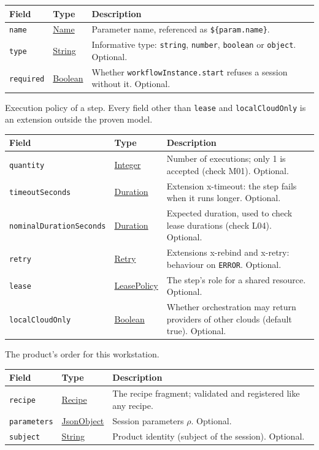 \documentclass[a4paper]{arrowhead}
\newcommand{\mref}[1]{{\textcolor{ArrowheadPurple}{\hyperref[sec:model:#1]{#1}}}}
\newcommand{\pref}[1]{{\textcolor{ArrowheadGrey}{\hyperref[sec:model:primitives:#1]{#1}}}}
\begin{document}
{\small
\begin{longtable}{|p{3.9cm}|p{4.4cm}|p{7.5cm}|}

\hline
\rowcolor{gray!33} Field & Type & Description \\ \hline
\endhead
\texttt{name} & \pref{Name} & Parameter name, referenced as \texttt{\$\{param.name\}}. \\ \hline
\texttt{type} & \pref{String} & Informative type: \texttt{string}, \texttt{number}, \texttt{boolean} or \texttt{object}. Optional. \\ \hline
\texttt{required} & \pref{Boolean} & Whether \texttt{workflow\allowbreak{}Instance.\allowbreak{}start} refuses a session without it. Optional. \\ \hline
\end{longtable}
}

Execution policy of a step. Every field other than \texttt{lease} and \texttt{local\allowbreak{}Cloud\allowbreak{}Only} is an extension outside the proven model.

{\small
\begin{longtable}{|p{3.9cm}|p{4.4cm}|p{7.5cm}|}

\hline
\rowcolor{gray!33} Field & Type & Description \\ \hline
\endhead
\texttt{quantity} & \pref{Integer} & Number of executions; only 1 is accepted (check M01). Optional. \\ \hline
\texttt{timeout\allowbreak{}Seconds} & \pref{Duration} & Extension x-timeout: the step fails when it runs longer. Optional. \\ \hline
\texttt{nominal\allowbreak{}Duration\allowbreak{}Seconds} & \pref{Duration} & Expected duration, used to check lease durations (check L04). Optional. \\ \hline
\texttt{retry} & \mref{Retry} & Extensions x-rebind and x-retry: behaviour on \texttt{ERROR}. Optional. \\ \hline
\texttt{lease} & \mref{LeasePolicy} & The step's role for a shared resource. Optional. \\ \hline
\texttt{local\allowbreak{}Cloud\allowbreak{}Only} & \pref{Boolean} & Whether orchestration may return providers of other clouds (default true). Optional. \\ \hline
\end{longtable}
}

The product's order for this workstation.

{\small
\begin{longtable}{|p{3.9cm}|p{4.4cm}|p{7.5cm}|}

\hline
\rowcolor{gray!33} Field & Type & Description \\ \hline
\endhead
\texttt{recipe} & \mref{Recipe} & The recipe fragment; validated and registered like any recipe. \\ \hline
\texttt{parameters} & \pref{JsonObject} & Session parameters $\rho$. Optional. \\ \hline
\texttt{subject} & \pref{String} & Product identity (subject of the session). Optional. \\ \hline
\end{longtable}
}
\end{document}
